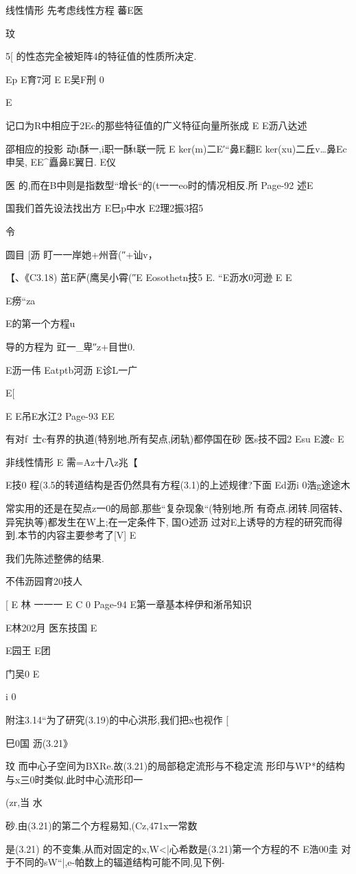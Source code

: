 {{线性情形
先考虑线性方程
蕃E医

玟

5[
的性态完全被矩阵4的特征值的性质所决定.

Ep
E育7河
E
E吴F刑
0

E

记口为R中相应于2Ec的那些特征值的广义特征向量所张成
E
E沥八达述

邵相应的投影
动t酥一,i职一酥t联一阮
E
ker(m)二E′“鼻E翻E
ker(xu)二丘v…鼻Ec申吴,
EE^矗鼻E翼日.
E仪

医
的,而在B中则是指数型“增长“的(t一一eo时的情况相反.所
Page-92
述E

国我们首先设法找出方
E巳p中水
E2理2振3招5

令

圆目
[沥
盯一一岸她+州音(″+讪v，

【、《C3.18)
茁E萨(鹰吴小霄(″E
Eosothetn技5
E.
“E沥水0河逊
E
E

E痨“za

E的第一个方程u

导的方程为
豇一_卑″z+目世0.

E沥一伟
Eatptb河沥
E诊L一广

E[

E
E吊E水江2
Page-93
EE

有对f~士c有界的执道(特别地,所有契点,闭轨)都停国在砂
医s技不园2
Esu
E渡c
E

非线性情形
E
需=Az十八z兆【

E技0
程(3.5的转道结构是否仍然具有方程(3.1)的上述规律?下面
Ed沥i
0浩g途途木

常实用的还是在契点z一0的局部,那些“复杂现象“(特别地,所
有奇点.闭转.同宿转、异宪执等)都发生在W上;在一定条件下,
国O述沥
过对E上诱导的方程的研究而得到.本节的内容主要参考了[V]
E

我们先陈述整佛的结果.

不伟沥园育20技人

[
E
林
一一一
E
C
0
Page-94
E第一章基本梓伊和淅吊知识

E林202月
医东技国
E

E园王
E团

门吴0
E

i
0

附注3.14“为了研究(3.19)的中心洪形,我们把x也视作
[

巳0国
沥(3.21》

玟
而中心子空间为BXRe.故(3.21)的局部稳定流形与不稳定流
形印与WP*的结构与x三0时类似.此时中心流形印一{(zr,当
水

砂.由(3.21)的第二个方程易知,(Cz,471x一常数}是(3.21)
的不变集,从而对固定的x,W<|心希数是(3.21)第一个方程的不
E浩00圭
对于不同的sW“|,e-帕数上的辐道结构可能不同,见下例-

}}
